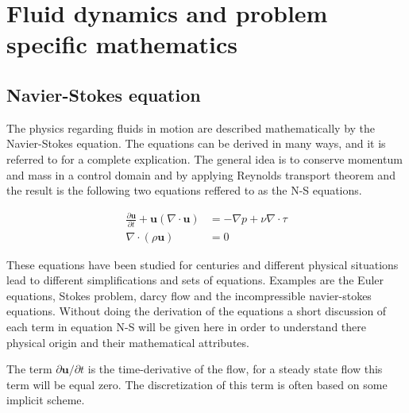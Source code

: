 
\chapter{Fluid dynamics and problem specific mathematics} %

\label{physics} %


\section{Navier-Stokes equation}

The physics regarding fluids in motion are described mathematically by the Navier-Stokes equation. The equations can be derived in many ways, 
and it is referred to \cite{White} for a complete explication. The general idea is to conserve momentum and mass in a control domain and by 
applying Reynolds transport theorem and the result is the following two equations reffered to as the N-S equations. 

\begin{align}
	\frac{\partial \mathbf{u}}{\partial t} + \mathbf{u} (\nabla \cdot \mathbf{u}) &= -\nabla p + \nu \nabla \cdot \tau \\
		\nabla \cdot (\rho \mathbf{u}) &= 0
	\label{eq:NS}
\end{align}

These equations have been studied for centuries and different physical situations lead to different simplifications and sets of equations. 
Examples are the Euler equations, Stokes problem, darcy flow and the incompressible navier-stokes equations. 
Without doing the derivation of the equations a short discussion of each term in equation N-S will be given here in order to understand there
physical origin and their mathematical attributes. 

The term $\partial \mathbf{u} /\partial t$  is the time-derivative of the flow, for a steady state flow this term will be equal zero.
The discretization of this term is often based on some implicit scheme.  

